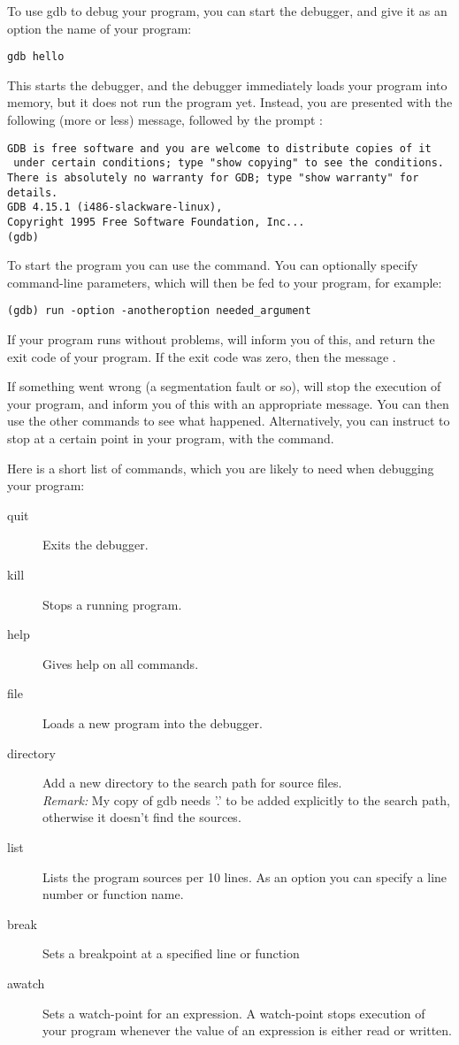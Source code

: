\documentclass{report}
\begin{document}
To use gdb to debug your program, you can start the debugger, and give it as
an option the name of your program:
\begin{verbatim}
gdb hello
\end{verbatim}
This starts the debugger, and the debugger immediately loads your program
into memory, but it does not run the program yet. Instead, you are presented
with the following (more or less) message, followed by the  prompt
:
\begin{verbatim}
GDB is free software and you are welcome to distribute copies of it
 under certain conditions; type "show copying" to see the conditions.
There is absolutely no warranty for GDB; type "show warranty" for details.
GDB 4.15.1 (i486-slackware-linux),
Copyright 1995 Free Software Foundation, Inc...
(gdb)
\end{verbatim}
To start the program you can use the  command. You can optionally 
specify command-line parameters, which will then be fed to your program, for
example:
\begin{verbatim}
(gdb) run -option -anotheroption needed_argument
\end{verbatim}
If your program runs without problems,  will inform you of this,
and return the exit code of your program. If the exit code was zero, then
the message .

If something went wrong (a segmentation fault or so),  will stop
the execution of your program, and inform you of this with an appropriate
message. You can then use the other  commands to see what happened.  
Alternatively, you can instruct  to stop at a certain point in your
program, with the  command.

Here is a short list of  commands, which you are likely to need when
debugging your program:
\begin{description}
\item [quit\ ] Exits the debugger.
\item [kill\ ] Stops a running program.
\item [help\ ] Gives help on all  commands.
\item [file\ ] Loads a new program into the debugger.
\item [directory\ ] Add a new directory to the search path for source
files.\\
{\em Remark:} My copy of gdb needs '.' to be added explicitly to the search
path, otherwise it doesn't find the sources.
\item [list\ ] Lists the program sources per 10 lines. As an option you can
specify a line number or function name.
\item [break\ ] Sets a breakpoint at a specified line or function
\item [awatch\ ] Sets a watch-point for an expression. A watch-point stops
execution of your program whenever the value of an expression is either 
read or written. 
\end{description}
\end{document}
